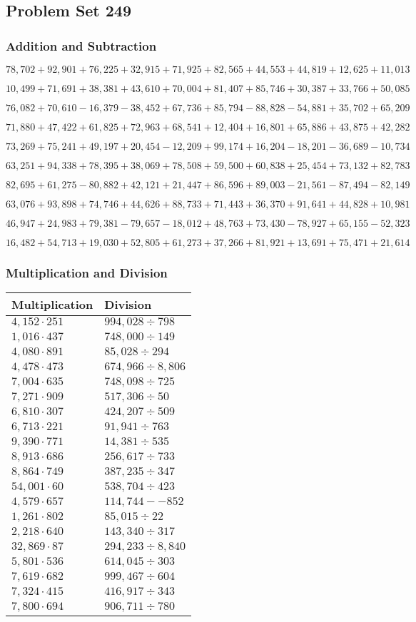 \hypertarget{problem-set-249}{%
\subsection{Problem Set 249}\label{problem-set-249}}

\hypertarget{addition-and-subtraction}{%
\subsubsection{Addition and
Subtraction}\label{addition-and-subtraction}}

\(78,702+92,901+76,225+32,915+71,925+82,565+44,553+44,819+12,625+11,013\)

\(10,499+71,691+38,381+43,610+70,004+81,407+85,746+30,387+33,766+50,085\)

\(76,082+70,610-16,379-38,452+67,736+85,794-88,828-54,881+35,702+65,209\)

\(71,880+47,422+61,825+72,963+68,541+12,404+16,801+65,886+43,875+42,282\)

\(73,269+75,241+49,197+20,454-12,209+99,174+16,204-18,201-36,689-10,734\)

\(63,251+94,338+78,395+38,069+78,508+59,500+60,838+25,454+73,132+82,783\)

\(82,695+61,275-80,882+42,121+21,447+86,596+89,003-21,561-87,494-82,149\)

\(63,076+93,898+74,746+44,626+88,733+71,443+36,370+91,641+44,828+10,981\)

\(46,947+24,983+79,381-79,657-18,012+48,763+73,430-78,927+65,155-52,323\)

\(16,482+54,713+19,030+52,805+61,273+37,266+81,921+13,691+75,471+21,614\)

\hypertarget{multiplication-and-division}{%
\subsubsection{Multiplication and
Division}\label{multiplication-and-division}}

\begin{longtable}[]{@{}ll@{}}
\toprule
Multiplication & Division\tabularnewline
\midrule
\endhead
\(4,152\cdot251\) & \(994,028÷798\)\tabularnewline
\(1,016\cdot437\) & \(748,000÷149\)\tabularnewline
\(4,080\cdot891\) & \(85,028÷294\)\tabularnewline
\(4,478\cdot473\) & \(674,966÷8,806\)\tabularnewline
\(7,004\cdot635\) & \(748,098÷725\)\tabularnewline
\(7,271\cdot909\) & \(517,306 ÷50\)\tabularnewline
\(6,810\cdot307\) & \(424,207÷509\)\tabularnewline
\(6,713\cdot221\) & \(91,941÷763\)\tabularnewline
\(9,390\cdot771\) & \(14,381÷535\)\tabularnewline
\(8,913\cdot686\) & \(256,617÷733\)\tabularnewline
\(8,864\cdot749\) & \(387,235÷347\)\tabularnewline
\(54,001\cdot60\) & \(538,704÷423\)\tabularnewline
\(4,579\cdot657\) & \(114,744 -- 852\)\tabularnewline
\(1,261\cdot802\) & \(85,015÷22\)\tabularnewline
\(2,218\cdot640\) & \(143,340÷317\)\tabularnewline
\(32,869\cdot87\) & \(294,233÷8,840\)\tabularnewline
\(5,801\cdot536\) & \(614,045÷303\)\tabularnewline
\(7,619\cdot682\) & \(999,467÷604\)\tabularnewline
\(7,324\cdot415\) & \(416,917÷343\)\tabularnewline
\(7,800\cdot694\) & \(906,711÷780\)\tabularnewline
\bottomrule
\end{longtable}
